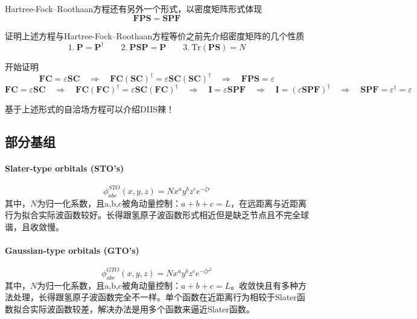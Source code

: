 Hartree-Fock–Roothaan方程还有另外一个形式，以密度矩阵形式体现
\[\mathbf{F}\mathbf{P}\mathbf{S}=\mathbf{S}\mathbf{P}\mathbf{F}\]

证明上述方程与Hartree-Fock–Roothaan方程等价之前先介绍密度矩阵的几个性质
\[1. \ \mathbf{P}=\mathbf{P}^{\dagger} \qquad 2. \ \mathbf{P}\mathbf{S}\mathbf{P}=\mathbf{P} \qquad 3.\ \text{Tr}(\mathbf{P}\mathbf{S})=N\]

开始证明
\[\mathbf{F}\mathbf{C}=\varepsilon\mathbf{S}\mathbf{C} \quad \Rightarrow \quad \mathbf{F}\mathbf{C}(\mathbf{S}\mathbf{C})^{\dagger}=\varepsilon\mathbf{S}\mathbf{C}(\mathbf{S}\mathbf{C})^{\dagger} \quad \Rightarrow \quad \mathbf{F}\mathbf{P}\mathbf{S}=\varepsilon\]
\[\mathbf{F}\mathbf{C}=\varepsilon\mathbf{S}\mathbf{C} \quad \Rightarrow \quad \mathbf{F}\mathbf{C}(\mathbf{F}\mathbf{C})^{\dagger}=\varepsilon\mathbf{S}\mathbf{C}(\mathbf{F}\mathbf{C})^{\dagger} \quad \Rightarrow \quad \mathbf{I}=\varepsilon\mathbf{S}\mathbf{P}\mathbf{F} \quad \Rightarrow \quad \mathbf{I}=(\varepsilon\mathbf{S}\mathbf{P}\mathbf{F})^{\dagger} \quad \Rightarrow \quad \mathbf{S}\mathbf{P}\mathbf{F}=\varepsilon^{\dagger}=\varepsilon\]

基于上述形式的自洽场方程可以介绍DIIS辣！


\subsection{部分基组}
\paragraph*{Slater-type orbitals (STO's)}
\[\phi_{abc}^{STO}(x,y,z)=Nx^ay^bz^ce^{-\zeta r}\]
其中，$N$为归一化系数，且a,b,c被角动量控制：$a+b+c=L$，在远距离与近距离行为拟合实际波函数较好。长得跟氢原子波函数形式相近但是缺乏节点且不完全球谐，且收敛慢。

\paragraph*{Gaussian-type orbitals (GTO's)}
\[\phi_{abc}^{GTO}(x,y,z)=Nx^ay^bz^ce^{-\zeta r^2}\]
其中，$N$为归一化系数，且a,b,c被角动量控制：$a+b+c=L$。收敛快且有多种方法处理，长得跟氢原子波函数完全不一样。单个函数在近距离行为相较于Slater函数拟合实际波函数较差，解决办法是用多个函数来逼近Slater函数。

